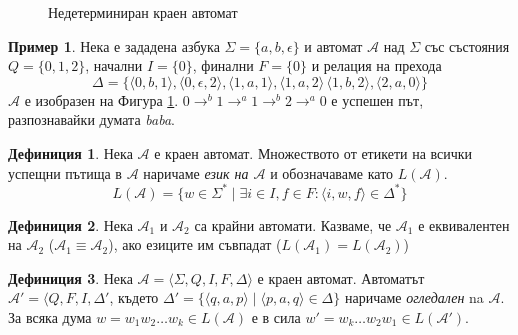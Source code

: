 \documentclass[12pt, oneside]{article}
\theoremstyle{definition}
\newtheorem{definition}{Дефиниция}[section]
\newtheorem{example}{Пример}[section]
\begin{document}
\begin{figure}[!htb]
	\centering
	
	\caption{Недетерминиран краен автомат}
	\label{fig:Nfa}
\end{figure}

\begin{example}
	Нека е зададена азбука \( \Sigma = \{ a,b,\epsilon \} \) и автомат \( \mathcal{A} \) над \( \Sigma \) със състояния \( Q = \{ 0, 1, 2 \} \), начални \( I = \{ 0 \} \), финални \( F = \{ 0 \} \) и релация на прехода 
	\[ \Delta = \{ \langle 0, b, 1 \rangle, \langle 0, \epsilon, 2 \rangle, \langle 1, a, 1 \rangle, \langle 1, a, 2 \rangle \, \langle 1, b, 2 \rangle, \langle 2, a, 0 \rangle \} \]
	\( \mathcal{A} \) е изобразен на Фигура \ref{fig:Nfa}. \( 0 \to^{b} 1 \to^{a} 1 \to^{b} 2 \to^{a} 0 \) е успешен път, разпознавайки думата \emph{baba}.
\end{example}

\begin{definition} 
	Нека \( \mathcal{A} \) е краен автомат. Множеството от етикети на всички успещни пътища в \( \mathcal{A} \) наричаме \emph{език на \( \mathcal{A} \)} и обозначаваме като \( L(\mathcal{A}) \). \[ L(\mathcal{A}) = \{ w \in \Sigma^* \mid \exists i \in I, f \in F : \langle i, w, f \rangle \in \Delta^* \} \]
\end{definition}

\begin{definition} 
	Нека \( \mathcal{A}_1 \) и \( \mathcal{A}_2 \) са крайни автомати. Казваме, че \( \mathcal{A}_1 \) е еквивалентен на \( \mathcal{A}_2 \) (\( \mathcal{A}_1 \equiv \mathcal{A}_2 \)), ако езиците им съвпадат (\( L(\mathcal{A}_1) = L(\mathcal{A}_2) \))
\end{definition}

\begin{definition}
	Нека \( \mathcal{A} = \langle \Sigma, Q, I, F, \Delta \rangle \) е краен автомат. Автоматът \(\mathcal{A'} = \langle Q, F, I, \Delta' \), където \( \Delta' = \{ \langle q, a, p \rangle \mid \langle p, a, q \rangle \in \Delta \} \) наричаме \emph{огледален} na \(\mathcal{A}\). За всяка дума \( w = w_1w_2 \dots w_k \in L(\mathcal{A}) \) е в сила \( w' = w_k \dots w_2w_1 \in L(\mathcal{A'}) \).
\end{definition}
\end{document}
